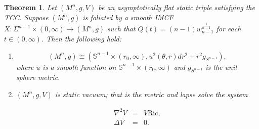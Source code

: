 \documentclass[12pt]{amsart}
\newtheorem{theorem}{Theorem}[section]
\theoremstyle{definition}
\numberwithin{equation}{section}
\begin{document}
\begin{theorem} \label{eq}
Let $(M^{n},g,V)$ be an asymptotically flat static triple satisfying the TCC. Suppose $(M^{n},g)$ is foliated by a smooth IMCF $X: \Sigma^{n-1} \times (0,\infty) \rightarrow (M^{n},g)$ such that $Q(t)=(n-1) w_{n-1}^{\frac{1}{n-1}}$ for each $t \in (0,\infty)$. Then the following hold:

\begin{enumerate}[label= (\roman*)]
    \item
    \begin{equation} \label{quasi_spherical}
        (M^{n},g) \cong (\mathbb{S}^{n-1} \times (r_{0},\infty), u^{2}(\theta,r) dr^{2} + r^{2} g_{S^{n-1}}),
    \end{equation}
    where $u$ is a smooth function on $\mathbb{S}^{n-1} \times (r_{0},\infty)$ and $g_{S^{n-1}}$ is the unit sphere metric.

    \item $(M^{n},g,V)$ is static vacuum; that is the metric and lapse solve the system

    \begin{eqnarray}
        \nabla^{2} V &=& V \text{Ric}, \label{vacuum} \\
        \Delta V &=& 0. \nonumber
    \end{eqnarray}
\end{enumerate}
\end{theorem}
\end{document}
